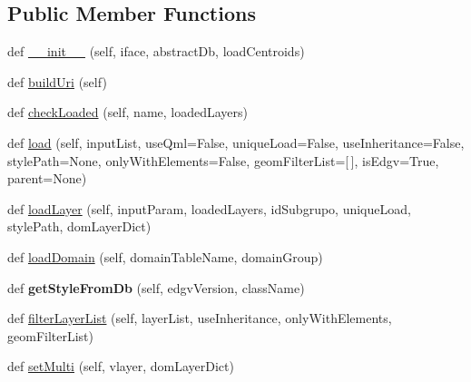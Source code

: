 \subsection*{Public Member Functions}
\begin{DoxyCompactItemize}
\item 
def \mbox{\hyperlink{class_dsg_tools_1_1_factories_1_1_layer_loader_factory_1_1spatialite_layer_loader_1_1_spatialite_layer_loader_ae37ca01c9ef61e2d30ae365e31670362}{\+\_\+\+\_\+init\+\_\+\+\_\+}} (self, iface, abstract\+Db, load\+Centroids)
\item 
def \mbox{\hyperlink{class_dsg_tools_1_1_factories_1_1_layer_loader_factory_1_1spatialite_layer_loader_1_1_spatialite_layer_loader_ae588795f1c9a3ea37f30a1505765bd0b}{build\+Uri}} (self)
\item 
def \mbox{\hyperlink{class_dsg_tools_1_1_factories_1_1_layer_loader_factory_1_1spatialite_layer_loader_1_1_spatialite_layer_loader_a4ae1129ae8af2875c36dd1b256d2dd54}{check\+Loaded}} (self, name, loaded\+Layers)
\item 
def \mbox{\hyperlink{class_dsg_tools_1_1_factories_1_1_layer_loader_factory_1_1spatialite_layer_loader_1_1_spatialite_layer_loader_a17fcbc72caf568e12a88b1b4c1449038}{load}} (self, input\+List, use\+Qml=False, unique\+Load=False, use\+Inheritance=False, style\+Path=None, only\+With\+Elements=False, geom\+Filter\+List=\mbox{[}$\,$\mbox{]}, is\+Edgv=True, parent=None)
\item 
def \mbox{\hyperlink{class_dsg_tools_1_1_factories_1_1_layer_loader_factory_1_1spatialite_layer_loader_1_1_spatialite_layer_loader_a56968bee64a3c937eea1bf57ab66bee1}{load\+Layer}} (self, input\+Param, loaded\+Layers, id\+Subgrupo, unique\+Load, style\+Path, dom\+Layer\+Dict)
\item 
def \mbox{\hyperlink{class_dsg_tools_1_1_factories_1_1_layer_loader_factory_1_1spatialite_layer_loader_1_1_spatialite_layer_loader_a8ad35427b9daaa2a7a44e3e8fd7fdd73}{load\+Domain}} (self, domain\+Table\+Name, domain\+Group)
\item 
\mbox{\label{class_dsg_tools_1_1_factories_1_1_layer_loader_factory_1_1spatialite_layer_loader_1_1_spatialite_layer_loader_ae956667bd58b3e5cf6f44dd904b605b7}} 
def {\bfseries get\+Style\+From\+Db} (self, edgv\+Version, class\+Name)
\item 
def \mbox{\hyperlink{class_dsg_tools_1_1_factories_1_1_layer_loader_factory_1_1spatialite_layer_loader_1_1_spatialite_layer_loader_aad3c3df9e70822f96bef5e08491c762c}{filter\+Layer\+List}} (self, layer\+List, use\+Inheritance, only\+With\+Elements, geom\+Filter\+List)
\item 
def \mbox{\hyperlink{class_dsg_tools_1_1_factories_1_1_layer_loader_factory_1_1spatialite_layer_loader_1_1_spatialite_layer_loader_a130db82fdcb6e28cd1a4ca12edec6c68}{set\+Multi}} (self, vlayer, dom\+Layer\+Dict)
\end{DoxyCompactItemize}
